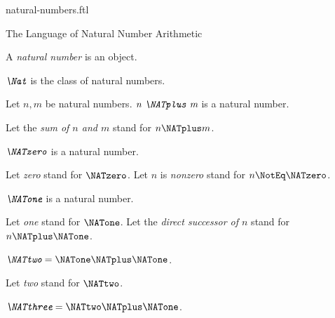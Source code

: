 \documentclass{stex}
\begin{document}
\begin{smodule}{natural-numbers.ftl}

\begin{sfragment}{The Language of Natural Number Arithmetic}
  \begin{signature}[forthel,id=ARITHMETIC_01_3074681254969344]
    A \emph{natural number} is an object.
  \end{signature}

  \begin{definition}[forthel,id=ARITHMETIC_01_7367148418629632]
    $\emph{\Nat}$ is the class of natural numbers.
  \end{definition}

  \begin{signature}[forthel,id=ARITHMETIC_01_1567933815848960]
    Let $n, m$ be natural numbers.
    $\emph{n \NATplus m}$ is a natural number.

    Let the \emph{sum of $n$ and $m$} stand for $n \NATplus m$.
  \end{signature}

  \begin{signature}[forthel,id=ARITHMETIC_01_7633304715001856]
    $\emph{\NATzero}$ is a natural number.

    Let \emph{zero} stand for $\NATzero$.
    Let $n$ is \emph{nonzero} stand for $n \NotEq \NATzero$.
  \end{signature}

  \begin{signature}[forthel,id=ARITHMETIC_01_1200254566985232]
    $\emph{\NATone}$ is a natural number.

    Let \emph{one} stand for $\NATone$.
    Let the \emph{direct successor of $n$} stand for $n \NATplus \NATone$.
  \end{signature}

  \begin{definition}[forthel,id=ARITHMETIC_01_4584236572999680]
    $\emph{\NATtwo} = \NATone \NATplus \NATone$.

    Let \emph{two} stand for $\NATtwo$.
  \end{definition}

  \begin{definition}[forthel,id=ARITHMETIC_01_3836725109456896]
    $\emph{\NATthree} = \NATtwo \NATplus \NATone$.


\end{definition}
\end{sfragment}
\end{smodule}
\end{document}
